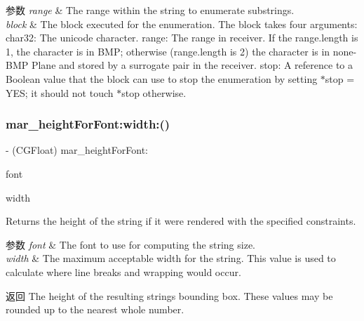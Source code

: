 \begin{DoxyParams}{参数}
{\em range} & The range within the string to enumerate substrings. \\
\hline
{\em block} & The block executed for the enumeration. The block takes four arguments\+: char32\+: The unicode character. range\+: The range in receiver. If the range.\+length is 1, the character is in B\+MP; otherwise (range.\+length is 2) the character is in none-\/\+B\+MP Plane and stored by a surrogate pair in the receiver. stop\+: A reference to a Boolean value that the block can use to stop the enumeration by setting $\ast$stop = Y\+ES; it should not touch $\ast$stop otherwise. \\
\hline
\end{DoxyParams}
\mbox{\label{category_n_s_string_07_m_a_r_e_x_08_a00607982510e24191e99101500b84f58}} 
\subsubsection{\texorpdfstring{mar\+\_\+height\+For\+Font\+:width\+:()}{mar\_heightForFont:width:()}}
{\footnotesize\ttfamily -\/ (C\+G\+Float) mar\+\_\+height\+For\+Font\+: \begin{DoxyParamCaption}\item[{(U\+I\+Font $\ast$)}]{font }\item[{width:(C\+G\+Float)}]{width }\end{DoxyParamCaption}}

Returns the height of the string if it were rendered with the specified constraints.


\begin{DoxyParams}{参数}
{\em font} & The font to use for computing the string size.\\
\hline
{\em width} & The maximum acceptable width for the string. This value is used to calculate where line breaks and wrapping would occur.\\
\hline
\end{DoxyParams}
\begin{DoxyReturn}{返回}
The height of the resulting string\textquotesingle{}s bounding box. These values may be rounded up to the nearest whole number. 
\end{DoxyReturn}
\mbox{\label{category_n_s_string_07_m_a_r_e_x_08_a1f14a1aa797a51ee147c72dcdbe00c40}} 
